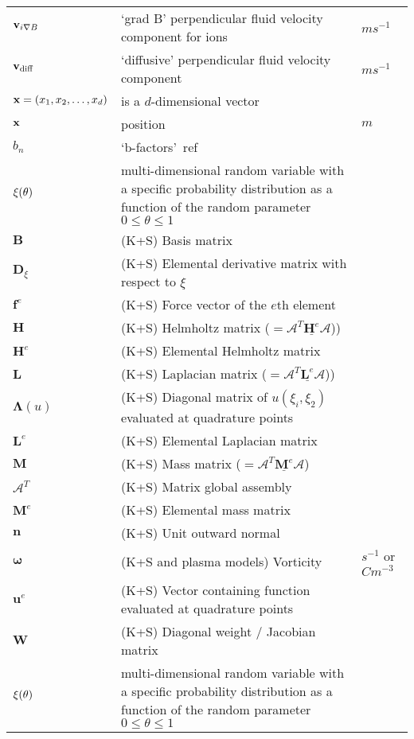 \begin{longtable}{|p{3.0cm}|p{10.0cm}|p{3.0cm}|}
${\bf v}_{i \nabla B}$ & `grad B' perpendicular fluid velocity component for ions  &  $m s^{-1}$ \\
${\bf v}_\textrm{diff}$ & `diffusive' perpendicular fluid velocity component  &  $m s^{-1}$ \\
${\bf x}=\left(x_1,x_2,\dots,x_d\right)$ & is a $d$-dimensional vector  & \\
${\bf x}$ & position  &  $m$ \\
$b_n$ & `b-factors'~ref~\cite[slide 21]{omullane} & \\
${\boldmath \xi}(\theta)$ & multi-dimensional random variable with a specific probability distribution as a function of the random parameter~$0\leq\theta\leq 1$ & \\
$\boldsymbol{B}$ &  (K+S) Basis matrix & \\
$\boldsymbol{D}_{\xi}$ &  (K+S) Elemental derivative matrix with respect to $\xi$ & \\
$\boldsymbol{f}^e$ &  (K+S) Force vector of the $e$th element & \\
$\boldsymbol{H}$ &  (K+S) Helmholtz matrix ($=\mathcal{A}^T \underline{\boldsymbol{H}^e} \mathcal{A}$)) & \\
$\boldsymbol{H}^e$ &  (K+S) Elemental Helmholtz matrix & \\
$\boldsymbol{L}$ &  (K+S) Laplacian matrix ($=\mathcal{A}^T \underline{\boldsymbol{L}^e} \mathcal{A}$)) & \\
$\boldsymbol{\Lambda}(u)$ &  (K+S) Diagonal matrix of $u(\xi_i, \xi_2)$ evaluated at quadrature points & \\
$\boldsymbol{L}^e$ &  (K+S) Elemental Laplacian matrix & \\
$\boldsymbol{M}$ &  (K+S) Mass matrix ($=\mathcal{A}^T \underline{\boldsymbol{M}^e} \mathcal{A}$) & \\
$\boldsymbol{\mathcal{A}}^T$ &  (K+S) Matrix global assembly & \\
$\boldsymbol{M}^e$ &  (K+S) Elemental mass matrix & \\
$\boldsymbol{n}$ &  (K+S) Unit outward normal & \\
$\boldsymbol{\omega}$ &  (K+S and plasma models) Vorticity & $s^{-1}$ or $C m^{-3}$\\
$\boldsymbol{u}^e$ &  (K+S) Vector containing function evaluated at quadrature points & \\
$\boldsymbol{W}$ &  (K+S) Diagonal weight / Jacobian matrix & \\
${\boldmath \xi}(\theta)$ & multi-dimensional random variable with a specific probability distribution as a function of the random parameter~$0\leq\theta\leq 1$ & \\

\end{longtable}
